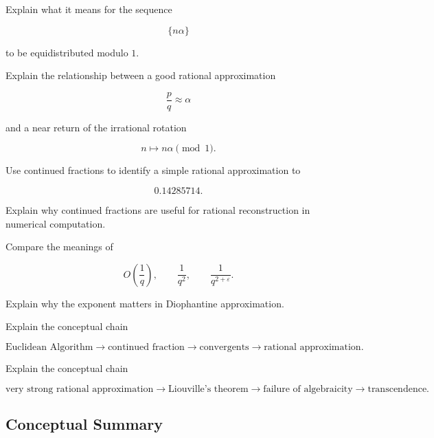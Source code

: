 \begin{exercise}[2]
Explain what it means for the sequence

\[ \{n\alpha\} \]

to be equidistributed modulo \(1\).
\end{exercise}

\begin{exercise}[3]
Explain the relationship between a good rational approximation

\[ \frac pq\approx\alpha \]

and a near return of the irrational rotation

\[ n\mapsto n\alpha\pmod1. \]
\end{exercise}

\begin{exercise}[2]
Use continued fractions to identify a simple rational approximation to

\[ 0.14285714. \]
\end{exercise}

\begin{exercise}[2]
Explain why continued fractions are useful for rational reconstruction in
numerical computation.
\end{exercise}

\begin{exercise}[3]
Compare the meanings of

\[ O\left(\frac1q\right),\qquad
\frac1{q^2},\qquad
\frac1{q^{2+\varepsilon}}. \]

Explain why the exponent matters in Diophantine approximation.
\end{exercise}

\begin{exercise}[3]
Explain the conceptual chain

\[
\text{Euclidean Algorithm}
\longrightarrow
\text{continued fraction}
\longrightarrow
\text{convergents}
\longrightarrow
\text{rational approximation}.
\]
\end{exercise}

\begin{exercise}[3]
Explain the conceptual chain

\[
\text{very strong rational approximation}
\longrightarrow
\text{Liouville's theorem}
\longrightarrow
\text{failure of algebraicity}
\longrightarrow
\text{transcendence}.
\]
\end{exercise}

\subsection{Conceptual Summary}
\label{subsec:diophantine-approximation-summary}

